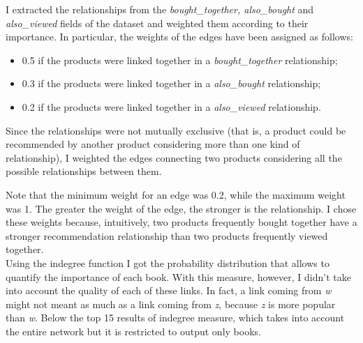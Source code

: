 \documentclass[a4paper,12pt]{article}
\begin{document}
\noindent I extracted the relationships from the \textit{bought\_together, also\_bought} and \textit{also\_viewed} fields of the dataset and weighted them according to their importance. In particular, the weights of the edges have been assigned as follows:

\begin{itemize}
	\item 0.5 if the products were linked together in a \textit{bought\_together} relationship;
	\item 0.3 if the products were linked together in a \textit{also\_bought} relationship;
	\item 0.2 if the products were linked together in a \textit{also\_viewed} relationship.
\end{itemize}

\bigskip
\noindent Since the relationships were not mutually exclusive (that is, a product could be recommended by another product considering more than one kind of relationship), I weighted the edges connecting two products considering all the possible relationships between them. 

\bigskip
\noindent Note that the minimum weight for an edge was 0.2, while the maximum weight was 1. The greater the weight of the edge, the stronger is the relationship. I chose these weights because, intuitively, two products frequently bought together have a stronger recommendation relationship than two products frequently viewed together. \\

\noindent Using the indegree function I got the probability distribution that allows to quantify the importance of each book. With this measure, however, I didn't take into account the quality of each of these links. In fact, a link coming from \textit{w} might not meant as much as a link coming from  \textit{z}, because  \textit{z} is more popular than  \textit{w}. Below the top 15 results of indegree measure, which takes into account the entire network but it is restricted to output only books.
\end{document}
